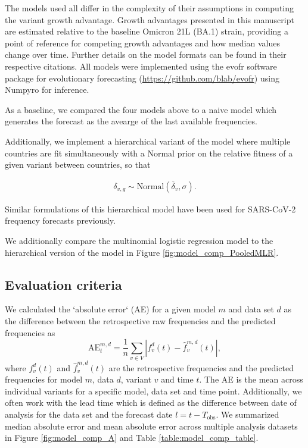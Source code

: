 \documentclass[11pt,oneside,letterpaper]{article}
\begin{document}
The models used all differ in the complexity of their assumptions in computing the variant growth advantage.
Growth advantages presented in this manuscript are estimated relative to the baseline Omicron 21L (BA.1) strain, providing a point of reference for competing growth advantages and how median values change over time.
Further details on the model formats can be found in their respective citations.
All models were implemented using the evofr software package for evolutionary forecasting (\href{https://github.com/blab/evofr}{https://github.com/blab/evofr}) using Numpyro for inference.

As a baseline, we compared the four models above to a naive model which generates the forecast as the avearge of the last available frequencies.

Additionally, we implement a hierarchical variant of the model where multiple countries are fit simultaneously with a Normal prior on the relative fitness of a given variant between countries, so that

\begin{align*}
    \delta_{v, g} \sim \text{Normal}(\overline{\delta}_{v}, \sigma).
\end{align*}

Similar formulations of this hierarchical model have been used for SARS-CoV-2 frequency forecasts previously. \cite{susswein2023leveraging}

We additionally compare the multinomial logistic regression model to the hierarchical version of the model in Figure \ref{fig:model_comp_PooledMLR}.

\subsection*{Evaluation criteria}

We calculated the `absolute error` (AE) for a given model $m$ and data set $d$ as the difference between the retrospective raw frequencies and the predicted frequencies as
\begin{equation}
    \mathrm{AE}_{t}^{m,d} = \frac{1}{n} \sum_{v \in V} \left|f_{v}^{d}(t) - \hat{f}^{m,d}_{v}(t) \right|,
\end{equation}
where $f_{v}^{d}(t)$ and $\hat{f}_{v}^{m,d}(t)$ are the retrospective frequencies and the predicted frequencies for model $m$, data $d$, variant $v$ and time $t$.
The AE is the mean across individual variants for a specific model, data set and time point.
Additionally, we often work with the lead time which is defined as the difference between date of analysis for the data set and the forecast date $l = t - T_{\text{obs}}$.
We summarized median absolute error and mean absolute error across multiple analysis datasets in Figure \ref{fig:model_comp_A} and Table \ref{table:model_comp_table}.
\end{document}
